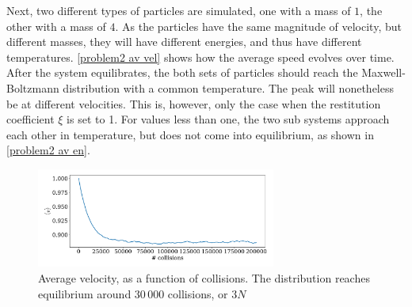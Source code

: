 \documentclass{article}
\begin{document}
    Next, two different types of particles are simulated, one with a mass of $1$, the other with a mass of $4$.
    As the particles have the same magnitude of velocity, but different masses, they will have different energies, and thus have different temperatures.
    \autoref{problem2 av vel} shows how the average speed evolves over time.
    After the system equilibrates, the both sets of particles should reach the Maxwell-Boltzmann distribution with a common temperature.
    The peak will nonetheless be at different velocities.
    This is, however, only the case when the restitution coefficient $\xi$ is set to 1.
    For values less than one, the two sub systems approach each other in temperature, but does not come into equilibrium, as shown in \autoref{problem2 av en}.

    \begin{figure}[H]
        \centering
        \includegraphics[width=0.7\textwidth]{../plots/problem1/v_av.pdf}
        \caption{Average velocity, as a function of collisions.
        The distribution reaches equilibrium around 30\,000 collisions, or $3N$}
        \label{problem1 av vel}
    \end{figure}
    
\end{document}

